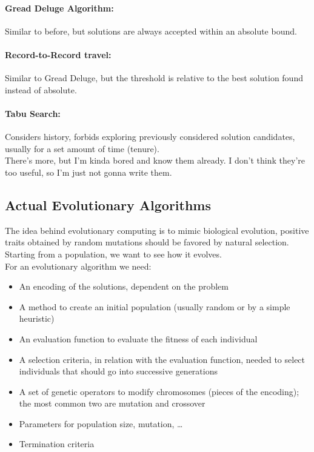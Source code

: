  \paragraph{Gread Deluge Algorithm:} Similar to before, but solutions are always accepted within an absolute bound.
 
 \paragraph{Record-to-Record travel:} Similar to Gread Deluge, but the threshold is relative to the best solution found instead of absolute.\\
 
 \paragraph{Tabu Search:} Considers history, forbids exploring previously considered solution candidates, usually for a set amount of time (tenure).\\
 
 There's more, but I'm kinda bored and know them already. I don't think they're too useful, so I'm just not gonna write them.\\
 
 \subsection{Actual Evolutionary Algorithms}
 
 The idea behind evolutionary computing is to mimic biological evolution, positive traits obtained by random mutations should be favored by natural selection. Starting from a population, we want to see how it evolves.\\
 
 For  an evolutionary algorithm we need: 
 \begin{itemize}
 	\item An encoding of the solutions, dependent on the problem
 	\item A method to create an initial population (usually random or by a simple heuristic)
 	\item An evaluation function to evaluate the fitness of each individual 
 	\item A selection criteria, in relation with the evaluation function, needed to select individuals that should go into successive generations
 	\item A set of genetic operators to modify chromosomes (pieces of the encoding); the most common two are mutation and crossover
 	\item Parameters for population size, mutation, \dots
 	\item Termination criteria
 \end{itemize}
 

